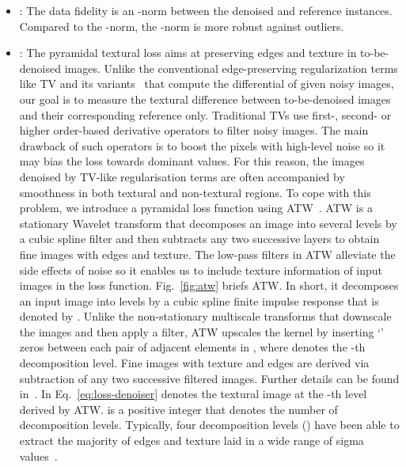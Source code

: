 \documentclass[journal,twoside,web]{ieeecolor}
\begin{document}
\begin{itemize}
    \item[] : The data fidelity is an -norm between the denoised and reference instances. Compared to the -norm, the -norm is more robust against outliers.
\item[] : The pyramidal textural loss aims at preserving edges and texture in to-be-denoised images. Unlike the conventional edge-preserving regularization terms like TV and its variants~\cite{papafitsoros2014combined,wang2019structural} that compute the differential of given noisy images, our goal is to measure the textural difference between to-be-denoised images and their corresponding reference only. 
    Traditional TVs use first-, second- or higher order-based derivative operators to filter noisy images. The main drawback of such operators is to boost the pixels with high-level noise so it may bias the loss towards dominant values. 
    For this reason, the images denoised by TV-like regularisation terms are often accompanied by smoothness in both textural and non-textural regions. 
    To cope with this problem, we introduce a pyramidal loss function using ATW~\cite{starck2007undecimated}. ATW is a stationary Wavelet transform that decomposes an image into several levels by a cubic spline filter and then subtracts any two successive layers to obtain fine images with edges and texture. 
    The low-pass filters in ATW alleviate the side effects of noise so it enables us to include texture information of input images in the loss function. 
    Fig.~\ref{fig:atw} briefs ATW. In short, it decomposes an input image into  levels by a cubic spline finite impulse response that is denoted by . Unlike the non-stationary multiscale transforms that downscale the images and then apply a filter, ATW upscales the kernel by inserting `' zeros  between each pair of adjacent elements in , where  denotes the -th decomposition level. 
    Fine images with texture and edges are derived via subtraction of any two successive filtered images. Further details can be found in~\cite{starck2007undecimated,ghahremani2020ffd}. 
    In Eq.~\ref{eq:loss-denoiser}  denotes the textural image at the -th level derived by ATW.  is a positive integer that denotes the number of decomposition levels. Typically, four decomposition levels () have been able to extract the majority of edges and texture laid in a wide range of sigma values~\cite{ghahremani2020ffd}. 

\end{itemize}
\end{document}

